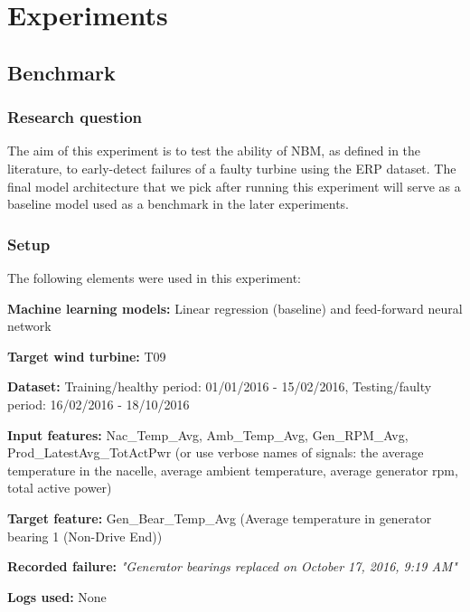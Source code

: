 \chapter{Experiments}
\label{chap:experiments}
\minitoc

\section{Benchmark}
\label{exp:I}

\subsection{Research question}
The aim of this experiment is to test the ability of NBM, as defined in the literature, to early-detect failures of a faulty turbine using the ERP dataset. The final model architecture that we pick after running this experiment will serve as a baseline model used as a benchmark in the later experiments.
\subsection{Setup}
The following elements were used in this experiment:
\begin{bulletList}
 \item \textbf{Machine learning models:} Linear regression (baseline) and feed-forward neural network
 \item \textbf{Target wind turbine:} T09
 \item \textbf{Dataset:} Training/healthy period: 01/01/2016 - 15/02/2016, Testing/faulty period: 16/02/2016 - 18/10/2016
 \item \textbf{Input features:} Nac\_Temp\_Avg, Amb\_Temp\_Avg, Gen\_RPM\_Avg, Prod\_LatestAvg\_TotActPwr (or use verbose names of signals: the average temperature in the nacelle, average ambient temperature, average generator rpm, total active power)
 \item \textbf{Target feature: } Gen\_Bear\_Temp\_Avg (Average temperature in generator bearing 1 (Non-Drive End))
  \item \textbf{Recorded failure:} \textit{"Generator bearings replaced on October 17, 2016, 9:19 AM"}
 \item \textbf{Logs used:} None
\end{bulletList}

